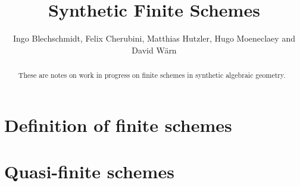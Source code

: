 \documentclass{../util/zariski-small}
\title{Synthetic Finite Schemes}
\theoremstyle{break}
\begin{document}
\author{Ingo Blechschmidt, Felix Cherubini, Matthias Hutzler, Hugo Moeneclaey and David Wärn}

\maketitle

\begin{abstract}
  These are notes on work in progress on finite schemes in synthetic algebraic geometry.
\end{abstract} 

\section{Definition of finite schemes}


\section{Quasi-finite schemes}


\printindex

\printbibliography
\end{document}
